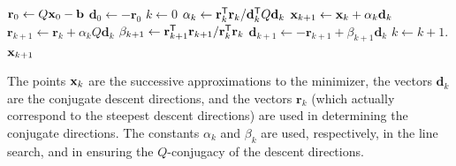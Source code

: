 
\begin{algorithm}[H]
\begin{algorithmic}[1]
    \State $\mathbf{r}_0 \gets Q\mathbf{x}_0 - \mathbf{b}$
    \State $\mathbf{d}_0 \gets -\mathbf{r}_0$
    \State $k \gets 0$
        \State $\alpha_k \gets \mathbf{r}_k^{\mathsf T} \mathbf{r}_k / \mathbf{d}_k^{\mathsf T} Q\mathbf{d}_k$
        \State $\mathbf{x}_{k+1} \gets \mathbf{x}_k + \alpha_k \mathbf{d}_k$
        \State $\mathbf{r}_{k+1} \gets \mathbf{r}_k + \alpha_k Q\mathbf{d}_k$
        \State $\beta_{k+1} \gets \mathbf{r}_{k+1}^{\mathsf T} \mathbf{r}_{k+1} / \mathbf{r}_k^{\mathsf T} \mathbf{r}_k$
        \State $\mathbf{d}_{k+1} \gets -\mathbf{r}_{k+1} + \beta_{k+1}\mathbf{d}_k$
        \State $k \gets k+1$.
    \EndWhile
     $\mathbf{x}_{k+1}$
\EndProcedure
\end{algorithmic}
\caption{The Conjugate Gradient method for solving the positive definite linear system $Q\x = \b$.}
\label{Alg:linear-conjugate-gradient}
\end{algorithm}

The points $\mathbf{x}_k$ are the successive approximations to the minimizer, the vectors $\mathbf{d}_k$ are the conjugate descent directions, and the vectors $\mathbf{r}_k$ (which actually correspond to the steepest descent directions) are used in determining the conjugate directions.
The constants $\alpha_k$ and $\beta_k$ are used, respectively, in the line search, and in ensuring the $Q$-conjugacy of the descent directions.

